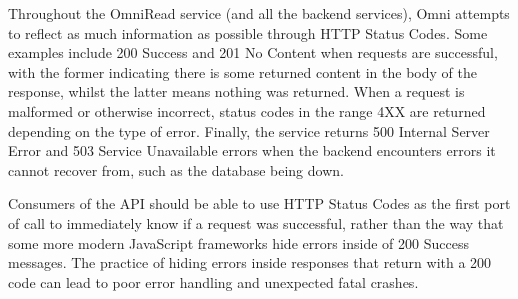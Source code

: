 Throughout the OmniRead service (and all the backend services), Omni attempts to reflect as much information as possible through HTTP Status Codes.
Some examples include 200 Success and 201 No Content when requests are successful, with the former indicating there is some returned content in the body of the response, whilst the latter means nothing was returned.
When a request is malformed or otherwise incorrect, status codes in the range 4XX are returned depending on the type of error.
Finally, the service returns 500 Internal Server Error and 503 Service Unavailable errors when the backend encounters errors it cannot recover from, such as the database being down. 

Consumers of the API should be able to use HTTP Status Codes as the first port of call to immediately know if a request was successful, rather than the way that some more modern JavaScript frameworks hide errors inside of 200 Success messages.
The practice of hiding errors inside responses that return with a 200 code can lead to poor error handling and unexpected fatal crashes.
